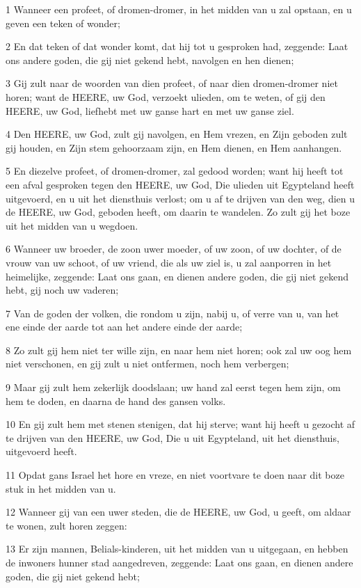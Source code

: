 \par 1 Wanneer een profeet, of dromen-dromer, in het midden van u zal opstaan, en u geven een teken of wonder;
\par 2 En dat teken of dat wonder komt, dat hij tot u gesproken had, zeggende: Laat ons andere goden, die gij niet gekend hebt, navolgen en hen dienen;
\par 3 Gij zult naar de woorden van dien profeet, of naar dien dromen-dromer niet horen; want de HEERE, uw God, verzoekt ulieden, om te weten, of gij den HEERE, uw God, liefhebt met uw ganse hart en met uw ganse ziel.
\par 4 Den HEERE, uw God, zult gij navolgen, en Hem vrezen, en Zijn geboden zult gij houden, en Zijn stem gehoorzaam zijn, en Hem dienen, en Hem aanhangen.
\par 5 En diezelve profeet, of dromen-dromer, zal gedood worden; want hij heeft tot een afval gesproken tegen den HEERE, uw God, Die ulieden uit Egypteland heeft uitgevoerd, en u uit het diensthuis verlost; om u af te drijven van den weg, dien u de HEERE, uw God, geboden heeft, om daarin te wandelen. Zo zult gij het boze uit het midden van u wegdoen.
\par 6 Wanneer uw broeder, de zoon uwer moeder, of uw zoon, of uw dochter, of de vrouw van uw schoot, of uw vriend, die als uw ziel is, u zal aanporren in het heimelijke, zeggende: Laat ons gaan, en dienen andere goden, die gij niet gekend hebt, gij noch uw vaderen;
\par 7 Van de goden der volken, die rondom u zijn, nabij u, of verre van u, van het ene einde der aarde tot aan het andere einde der aarde;
\par 8 Zo zult gij hem niet ter wille zijn, en naar hem niet horen; ook zal uw oog hem niet verschonen, en gij zult u niet ontfermen, noch hem verbergen;
\par 9 Maar gij zult hem zekerlijk doodslaan; uw hand zal eerst tegen hem zijn, om hem te doden, en daarna de hand des gansen volks.
\par 10 En gij zult hem met stenen stenigen, dat hij sterve; want hij heeft u gezocht af te drijven van den HEERE, uw God, Die u uit Egypteland, uit het diensthuis, uitgevoerd heeft.
\par 11 Opdat gans Israel het hore en vreze, en niet voortvare te doen naar dit boze stuk in het midden van u.
\par 12 Wanneer gij van een uwer steden, die de HEERE, uw God, u geeft, om aldaar te wonen, zult horen zeggen:
\par 13 Er zijn mannen, Belials-kinderen, uit het midden van u uitgegaan, en hebben de inwoners hunner stad aangedreven, zeggende: Laat ons gaan, en dienen andere goden, die gij niet gekend hebt;
